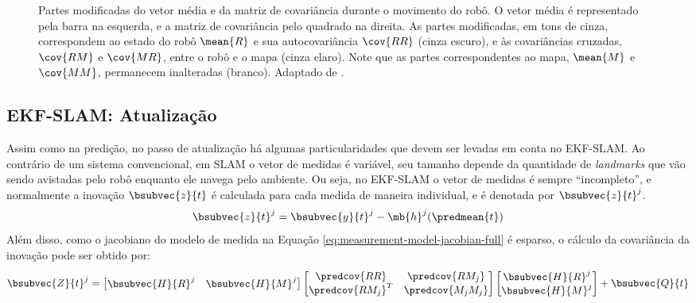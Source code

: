 \begin{figure}[h]
  \centering
  
  \caption{Partes modificadas do vetor média e da matriz de covariância durante o movimento do robô. O vetor média é representado pela barra na esquerda, e a matriz de covariância pelo quadrado na direita. As partes modificadas, em tons de cinza, correspondem ao estado do robô $\mean{R}$  e sua autocovariância $\cov{RR}$ (cinza escuro), e às covariâncias cruzadas, $\cov{RM}$ e $\cov{MR}$, entre o robô e o mapa (cinza claro). Note que as partes correspondentes ao mapa, $\mean{M}$ e $\cov{MM}$, 
  permanecem inalteradas (branco). Adaptado de \cite[p.~10]{jsola}.}
  \label{fig:ekfslam-prediction}
\end{figure}


\subsection{EKF-SLAM: Atualização}
\label{sec:ekf-slam-update}
Assim como na predição, no passo de atualização há algumas particularidades 
que devem ser levadas em conta no EKF-SLAM. Ao contrário de um sistema convencional, em SLAM o vetor de medidas é variável, seu tamanho depende da 
quantidade de \textit{landmarks} que vão sendo avistadas pelo robô enquanto 
ele navega pelo ambiente. Ou seja, no EKF-SLAM o vetor de medidas é sempre 
``incompleto'', e normalmente a inovação $\bsubvec{z}{t}$ é calculada para cada 
medida de maneira individual, e é denotada por $\bsubvec{z}{t}^j$.
\begin{equation}
  \bsubvec{z}{t}^j = \bsubvec{y}{t}^j - \mb{h}^j(\predmean{t})
  \label{eq:ekf-slam-innovation}
\end{equation}
Além disso, como o jacobiano do modelo de medida na Equação \ref{eq:measurement-model-jacobian-full} é esparso, o cálculo da covariância da inovação pode ser obtido por:
\renewcommand{\arraystretch}{1.5}
\begin{equation}
  \bsubvec{Z}{t}^j = \begin{bmatrix}
    \bsubvec{H}{R}^j & \bsubvec{H}{M}^j
  \end{bmatrix}
  \begin{bmatrix}
    \predcov{RR} & \predcov{RM_j} \\
    \predcov{RM_j}^T & \predcov{M_j M_j}
  \end{bmatrix}
  \begin{bmatrix}
    \bsubvec{H}{R}^j \\ \bsubvec{H}{M}^j
  \end{bmatrix} + \bsubvec{Q}{t}
  \label{eq:ekf-slam-innovation-covariance}
\end{equation}
